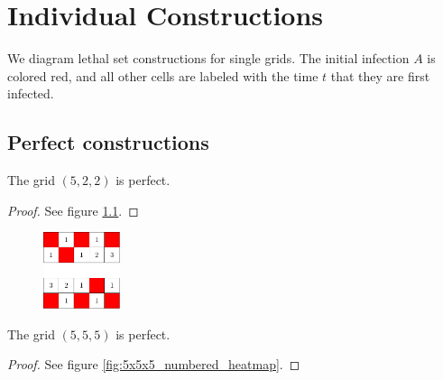 \appendix
\chapter{Individual Constructions}

We diagram lethal set constructions for single grids. The initial infection $A$ is colored red, and all other cells are labeled with the time $t$ that they are first infected. 

\section{Perfect constructions}

\begin{con}
\label{con:5x2x2}
The grid $(5,2,2)$ is perfect.
\end{con}

\begin{proof}
See figure \ref{fig:2x5x2_numbered_heatmap}.
\end{proof}

\begin{figure}[]
\centering
\includegraphics[width=0.2\textwidth]{figures/7/2x5x2_numbered_heatmap.pdf}
\caption{}
\label{fig:2x5x2_numbered_heatmap}
\end{figure} 

\begin{con}
\label{con:5x5x5}
The grid $(5,5,5)$ is perfect.
\end{con}

\begin{proof}
See figure \ref{fig:5x5x5_numbered_heatmap}.
\end{proof}

